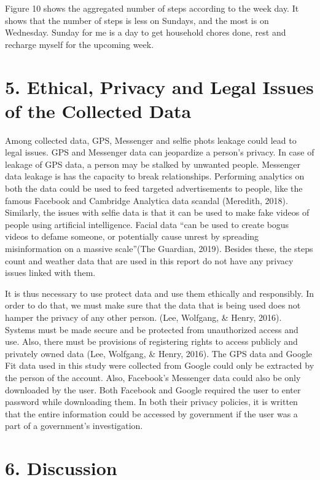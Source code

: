 \documentclass[
]{article}
\begin{document}
Figure 10 shows the aggregated number of steps according to the week
day. It shows that the number of steps is less on Sundays, and the most
is on Wednesday. Sunday for me is a day to get household chores done,
rest and recharge myself for the upcoming week.

\hypertarget{ethical-privacy-and-legal-issues-of-the-collected-data}{%
\section{5. Ethical, Privacy and Legal Issues of the Collected
Data}\label{ethical-privacy-and-legal-issues-of-the-collected-data}}

Among collected data, GPS, Messenger and selfie phots leakage could lead
to legal issues. GPS and Messenger data can jeopardize a person's
privacy. In case of leakage of GPS data, a person may be stalked by
unwanted people. Messenger data leakage is has the capacity to break
relationships. Performing analytics on both the data could be used to
feed targeted advertisements to people, like the famous Facebook and
Cambridge Analytica data scandal (Meredith, 2018). Similarly, the issues
with selfie data is that it can be used to make fake videos of people
using artificial intelligence. Facial data ``can be used to create bogus
videos to defame someone, or potentially cause unrest by spreading
misinformation on a massive scale''(The Guardian, 2019). Besides these,
the steps count and weather data that are used in this report do not
have any privacy issues linked with them.

It is thus necessary to use protect data and use them ethically and
responsibly. In order to do that, we must make sure that the data that
is being used does not hamper the privacy of any other person. (Lee,
Wolfgang, \& Henry, 2016). Systems must be made secure and be protected
from unauthorized access and use. Also, there must be provisions of
registering rights to access publicly and privately owned data (Lee,
Wolfgang, \& Henry, 2016). The GPS data and Google Fit data used in this
study were collected from Google could only be extracted by the person
of the account. Also, Facebook's Messenger data could also be only
downloaded by the user. Both Facebook and Google required the user to
enter password while downloading them. In both their privacy policies,
it is written that the entire information could be accessed by
government if the user was a part of a government's investigation.

\hypertarget{discussion}{%
\section{6. Discussion}\label{discussion}}
\end{document}
